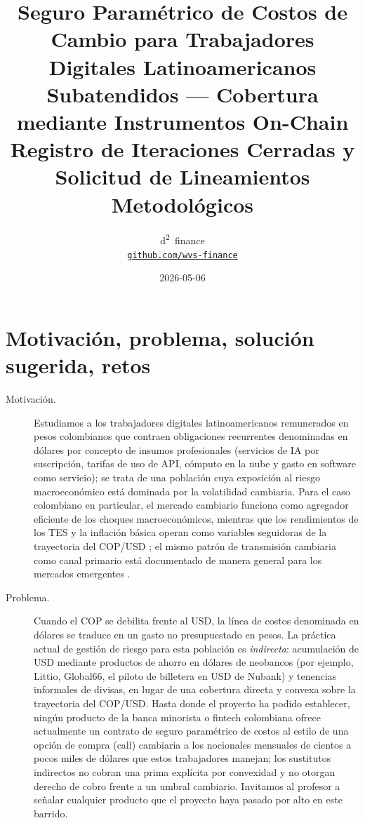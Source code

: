 \documentclass[11pt,a4paper]{article}
\title{Seguro Paramétrico de Costos de Cambio para Trabajadores Digitales Latinoamericanos Subatendidos --- Cobertura mediante Instrumentos On-Chain \\[0.5em]
\large Registro de Iteraciones Cerradas y Solicitud de Lineamientos Metodológicos}
\author{d\textsuperscript{2}~finance \\ \href{https://github.com/wvs-finance}{\texttt{github.com/wvs-finance}}}
\date{2026-05-06}
\theoremstyle{plain}
\begin{document}
\maketitle
\thispagestyle{empty}

\section{Motivación, problema, solución sugerida, retos}\label{sec:1}

\begin{description}
  \item[Motivación.] Estudiamos a los trabajadores digitales latinoamericanos remunerados en pesos colombianos que contraen obligaciones recurrentes denominadas en dólares por concepto de insumos profesionales (servicios de IA por suscripción, tarifas de uso de API, cómputo en la nube y gasto en software como servicio); se trata de una población cuya exposición al riesgo macroeconómico está dominada por la volatilidad cambiaria. Para el caso colombiano en particular, el mercado cambiario funciona como agregador eficiente de los choques macroeconómicos, mientras que los rendimientos de los TES y la inflación básica operan como variables seguidoras de la trayectoria del COP/USD \citep{rincontorresInterdependenceFXTreasury2021,rincontorresLowFrequencyEffectMacroNews2023,rinconcastroTraspasoTasaCambio2021,fuentesIntradayExchangeRate2014}; el mismo patrón de transmisión cambiaria como canal primario está documentado de manera general para los mercados emergentes \citep{calvo_reinhart_2002,rey_2015,bruno_shin_2015}.
  \item[Problema.] Cuando el COP se debilita frente al USD, la línea de costos denominada en dólares se traduce en un gasto no presupuestado en pesos. La práctica actual de gestión de riesgo para esta población es \emph{indirecta}: acumulación de USD mediante productos de ahorro en dólares de neobancos (por ejemplo, Littio, Global66, el piloto de billetera en USD de Nubank) y tenencias informales de divisas, en lugar de una cobertura directa y convexa sobre la trayectoria del COP/USD. Hasta donde el proyecto ha podido establecer, ningún producto de la banca minorista o fintech colombiana ofrece actualmente un contrato de seguro paramétrico de costos al estilo de una opción de compra (call) cambiaria a los nocionales mensuales de cientos a pocos miles de dólares que estos trabajadores manejan; los sustitutos indirectos no cobran una prima explícita por convexidad y no otorgan derecho de cobro frente a un umbral cambiario. Invitamos al profesor a señalar cualquier producto que el proyecto haya pasado por alto en este barrido.

\end{description}
\end{document}
